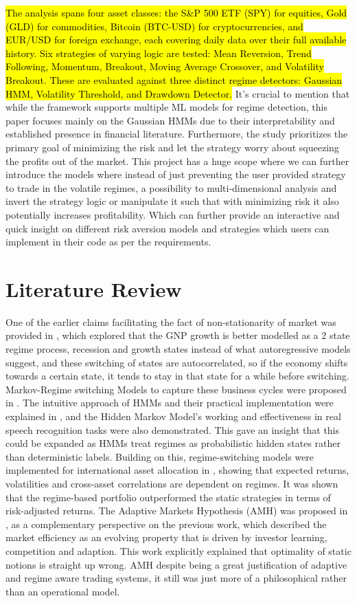 \documentclass[conference]{IEEEtran}
\begin{document}
\hl{The analysis spans four asset classes: the S\&P 500 ETF (SPY) for equities, Gold (GLD) for commodities, Bitcoin (BTC-USD) for cryptocurrencies, and EUR/USD for foreign exchange, each covering daily data over their full available history. Six strategies of varying logic are tested: Mean Reversion, Trend Following, Momentum, Breakout, Moving Average Crossover, and Volatility Breakout. These are evaluated against three distinct regime detectors: Gaussian HMM, Volatility Threshold, and Drawdown Detector.} It's crucial to mention that while the framework supports multiple ML models for regime detection, this paper focuses mainly on the Gaussian HMMs due to their interpretability and established presence in financial literature. Furthermore, the study prioritizes the primary goal of minimizing the risk and let the strategy worry about squeezing the profits out of the market. This project has a huge scope where we can further introduce the models where instead of just preventing the user provided strategy to trade in the volatile regimes, a possibility to multi-dimensional analysis and invert the strategy logic or manipulate it such that with minimizing risk it also potentially increases profitability. Which can further provide an interactive and quick insight on different risk aversion models and strategies which users can implement in their code as per the requirements.

\section{Literature Review}

One of the earlier claims facilitating the fact of non-stationarity of market was provided in \cite{b1}, which explored that the GNP growth is better modelled as a 2 state regime process, recession and growth states instead of what autoregressive models suggest, and these switching of states are autocorrelated, so if the economy shifts towards a certain state, it tends to stay in that state for a while before switching. Markov-Regime switching Models to capture these business cycles were proposed in \cite{b1}. The intuitive approach of HMMs and their practical implementation were explained in \cite{b2}, and the Hidden Markov Model's working and effectiveness in real speech recognition tasks were also demonstrated. This gave an insight that this could be expanded as HMMs treat regimes as probabilistic hidden states rather than deterministic labels. Building on this, regime-switching models were implemented for international asset allocation in \cite{b3}, showing that expected returns, volatilities and cross-asset correlations are dependent on regimes. It was shown that the regime-based portfolio outperformed the static strategies in terms of risk-adjusted returns. The Adaptive Markets Hypothesis (AMH) was proposed in \cite{b4}, as a complementary perspective on the previous work, which described the market efficiency as an evolving property that is driven by investor learning, competition and adaption. This work explicitly explained that optimality of static notions is straight up wrong. AMH despite being a great justification of adaptive and regime aware trading systems, it still was just more of a philosophical rather than an operational model.
\end{document}
